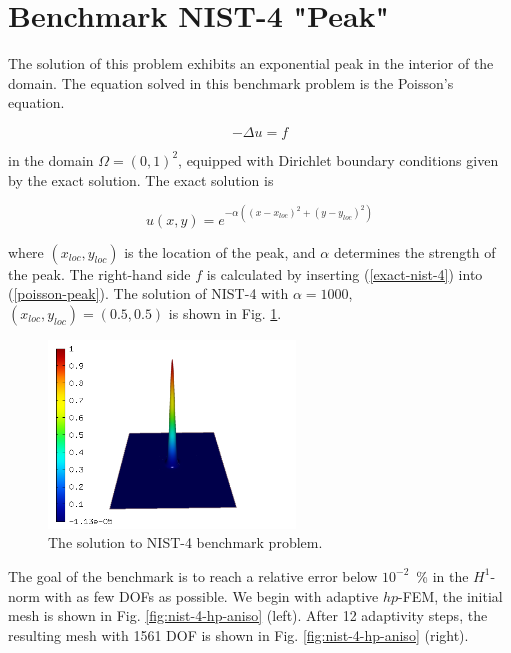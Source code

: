 \section{Benchmark NIST-4 "Peak"}
\label{sec:bench-4}

The solution of this problem exhibits an exponential peak in the interior of the domain.
The equation solved in this benchmark problem is the Poisson's equation.

\begin{equation} \label{poisson-peak}
-\Delta u = f 
\end{equation}

in the domain $\Omega = (0, 1)^2$, equipped with Dirichlet
boundary conditions given by the exact solution.
The exact solution is

\begin{equation}\label{exact-nist-4}
u(x,y) = e^{-\alpha ((x - x_{loc})^{2} + (y - y_{loc})^{2})} 
\end{equation}

where $(x_{loc}, y_{loc})$ is the location of the peak,
and $\alpha$ determines the strength of the peak.
The right-hand side $f$ is calculated by inserting (\ref{exact-nist-4}) into (\ref{poisson-peak}).
The solution of NIST-4 with $\alpha = 1000$,
$(x_{loc}, y_{loc}) = (0.5, 0.5)$ is shown in Fig. \ref{fig:sln-nist04}.

\begin{figure}[!ht]
\centering
\includegraphics[height=5cm]{nist/nist-4/solution.png}
\caption{The solution to NIST-4 benchmark problem.}
\label{fig:sln-nist04}
\end{figure}

The goal of the benchmark is to reach a relative error below
$10^{-2}$~\% in the $H^1$-norm with as few DOFs as possible.
We begin with adaptive $hp$-FEM,
the initial mesh is shown in Fig. \ref{fig:nist-4-hp-aniso} (left).
After 12 adaptivity steps, the resulting mesh with 1561 DOF is shown
in Fig. \ref{fig:nist-4-hp-aniso} (right).

